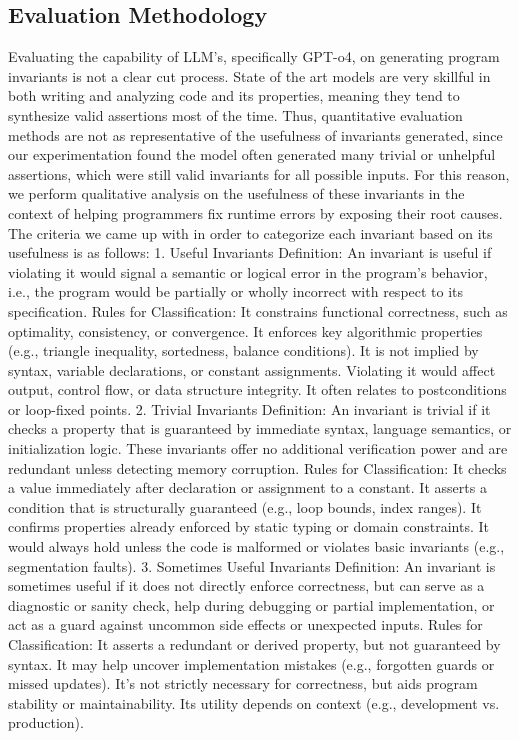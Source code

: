 \documentclass[conference]{IEEEtran}
\begin{document}
\subsection{Evaluation Methodology}\label{AA}
Evaluating the capability of LLM’s, specifically GPT-o4, on generating program invariants is not a clear cut process. State of the art models are very skillful in both writing and analyzing code and its properties, meaning they tend to synthesize valid assertions most of the time. Thus, quantitative evaluation methods are not as representative of the usefulness of invariants generated, since our experimentation found the model often generated many trivial or unhelpful assertions, which were still valid invariants for all possible inputs. For this reason, we perform qualitative analysis on the usefulness of these invariants in the context of helping programmers fix runtime errors by exposing their root causes. The criteria we came up with in order to categorize each invariant based on its usefulness is as follows:
1. Useful Invariants
Definition: An invariant is useful if violating it would signal a semantic or logical error in the program's behavior, i.e., the program would be partially or wholly incorrect with respect to its specification.
Rules for Classification:
It constrains functional correctness, such as optimality, consistency, or convergence.
It enforces key algorithmic properties (e.g., triangle inequality, sortedness, balance conditions).
It is not implied by syntax, variable declarations, or constant assignments.
Violating it would affect output, control flow, or data structure integrity.
It often relates to postconditions or loop-fixed points.
2. Trivial Invariants
Definition: An invariant is trivial if it checks a property that is guaranteed by immediate syntax, language semantics, or initialization logic. These invariants offer no additional verification power and are redundant unless detecting memory corruption.
Rules for Classification:
It checks a value immediately after declaration or assignment to a constant.
It asserts a condition that is structurally guaranteed (e.g., loop bounds, index ranges).
It confirms properties already enforced by static typing or domain constraints.
It would always hold unless the code is malformed or violates basic invariants (e.g., segmentation faults).
3. Sometimes Useful Invariants
Definition: An invariant is sometimes useful if it does not directly enforce correctness, but can serve as a diagnostic or sanity check, help during debugging or partial implementation, or act as a guard against uncommon side effects or unexpected inputs.
Rules for Classification:
It asserts a redundant or derived property, but not guaranteed by syntax.
It may help uncover implementation mistakes (e.g., forgotten guards or missed updates).
It’s not strictly necessary for correctness, but aids program stability or maintainability.
Its utility depends on context (e.g., development vs. production).
\end{document}

